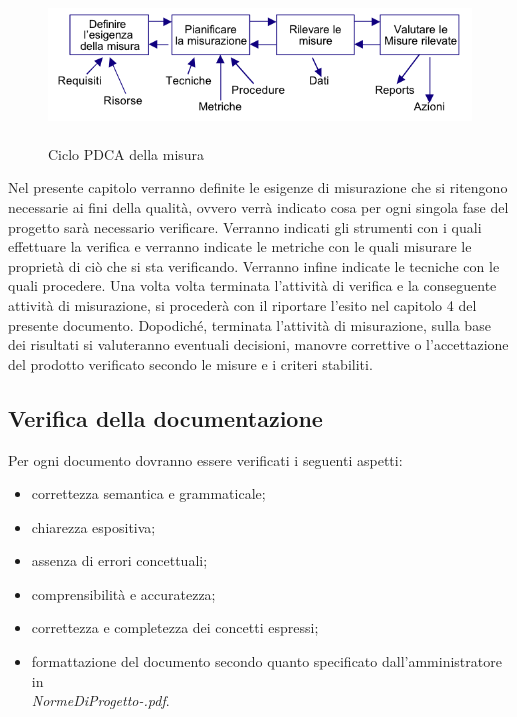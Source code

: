 \begin{figure}[h]
  \centering
  \includegraphics[height=4cm]{img/PQ/pdca.png}
\caption{Ciclo PDCA della misura}
\end{figure}

Nel presente capitolo verranno definite le esigenze di misurazione che si
ritengono necessarie ai fini della qualit\`a, ovvero verr\`a indicato cosa per ogni
singola fase del progetto sar\`a necessario verificare. Verranno indicati gli
strumenti con i quali effettuare la verifica e verranno indicate le metriche con
le quali misurare le propriet\`a di ci\`o che si sta verificando. Verranno
infine indicate le tecniche con le quali procedere. Una volta volta terminata
l'attivit\`a di verifica e la conseguente attivit\`a di misurazione, si proceder\`a con il
riportare l'esito nel capitolo 4 del presente documento. Dopodich\'e, terminata
l'attivit\`a di misurazione, sulla base dei risultati si valuteranno eventuali
decisioni, manovre correttive o l'accettazione del prodotto verificato secondo
le misure e i criteri stabiliti.


\subsection{Verifica della documentazione}

Per ogni documento dovranno essere verificati i seguenti aspetti:
\begin{itemize}
\item correttezza semantica e grammaticale;
\item chiarezza espositiva;
\item assenza di errori concettuali;
\item comprensibilit\`a e accuratezza;
\item correttezza e completezza dei concetti espressi;
\item formattazione del documento secondo quanto specificato dall'amministratore
in\\ \emph{NormeDiProgetto-\versionenormeprogetto.pdf}.
\end{itemize}

